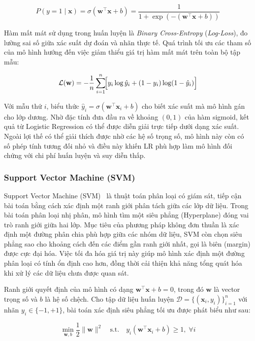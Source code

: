 \[
P(y=1 \mid \mathbf{x}) = \sigma(\mathbf{w}^\top \mathbf{x} + b) = \frac{1}{1 + \exp(-(\mathbf{w}^\top \mathbf{x} + b))}
\]

Hàm mất mát sử dụng trong huấn luyện là \textit{Binary Cross-Entropy} (\textit{Log-Loss}), đo lường sai số giữa xác suất dự đoán và nhãn thực tế. Quá trình tối ưu các tham số của mô hình hướng đến việc giảm thiểu giá trị hàm mất mát trên toàn bộ tập mẫu:

\[
\mathcal{L}(\mathbf{w}) = -\frac{1}{n}\sum_{i=1}^{n}\!\Bigl[
    y_i \log \hat{y}_i + (1-y_i)\log(1-\hat{y}_i)
\Bigr]
\]

Với mẫu thứ $i$, biểu thức $\hat{y}_i = \sigma(\mathbf{w}^\top\mathbf{x}_i + b)$ cho biết xác suất mà mô hình gán cho lớp dương. Nhờ đặc tính đưa đầu ra về khoảng $(0,1)$ của hàm sigmoid, kết quả từ Logistic Regression có thể được diễn giải trực tiếp dưới dạng xác suất. Ngoài lợi thế có thể giải thích được nhờ các hệ số trọng số, mô hình này còn có số phép tính tương đối nhỏ và điều này khiến LR phù hợp làm mô hình đối chứng với chi phí huấn luyện và suy diễn thấp.

\subsubsection{Support Vector Machine (SVM)}

Support Vector Machine (SVM)~\cite{cortes1995svm} là thuật toán phân loại có giám sát, tiếp cận bài toán bằng cách xác định một ranh giới phân tách giữa các lớp dữ liệu. Trong bài toán phân loại nhị phân, mô hình tìm một siêu phẳng (Hyperplane) đóng vai trò ranh giới giữa hai lớp. Mục tiêu của phương pháp không đơn thuần là xác định một đường phân chia phù hợp giữa các nhóm dữ liệu, SVM còn chọn siêu phẳng sao cho khoảng cách đến các điểm gần ranh giới nhất,  gọi là biên (margin) được cực đại hóa. Việc tối đa hóa giá trị này giúp mô hình xác định một đường phân loại có tính ổn định cao hơn, đồng thời cải thiện khả năng tổng quát hóa khi xử lý các dữ liệu chưa được quan sát.

Ranh giới quyết định của mô hình có dạng $\mathbf{w}^\top\mathbf{x} + b = 0$, trong đó $\mathbf{w}$ là vector trọng số và $b$ là hệ số chệch. Cho tập dữ liệu huấn luyện $\mathcal{D} = \{(\mathbf{x}_i, y_i)\}_{i=1}^{n}$ với nhãn $y_i \in \{-1,+1\}$, bài toán xác định siêu phẳng tối ưu được phát biểu như sau:

\[
  \min_{\mathbf{w}, b} \frac{1}{2}\|\mathbf{w}\|^2 \quad \text{s.t.} \quad y_i(\mathbf{w}^\top \mathbf{x}_i + b) \geq 1,\; \forall i
\]

